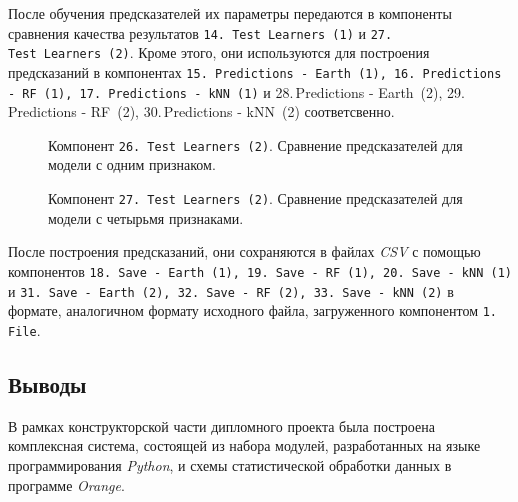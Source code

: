 После обучения предсказателей их параметры передаются в компоненты сравнения качества результатов \texttt{14.\,Test~Learners~(1)} и \texttt{27.\,Test~Learners~(2)}. Кроме этого, они используются для построения предсказаний в компонентах \texttt{15.\,Predictions - Earth~(1), 16.\,Predictions - RF~(1), 17.\,Predictions - kNN~(1)} и {28.\,Predictions - Earth~(2), 29.\,Predictions - RF~(2), 30.\,Predictions - kNN~(2)} соответсвенно.

\begin{figure}[tbp]
    \caption{Компонент \texttt{26.\,Test~Learners~(2)}. Сравнение предсказателей для модели с одним признаком.}
    \label{img:14-Test-Learners-1}
\end{figure}

\begin{figure}[tbp]
    \caption{Компонент \texttt{27.\,Test~Learners~(2)}. Сравнение предсказателей для модели с четырьмя признаками.}
    \label{img:27-Test-Learners-2}
\end{figure}

После построения предсказаний, они сохраняются в файлах \textit{CSV} с помощью компонентов \texttt{18.\,Save - Earth~(1), 19.\,Save - RF~(1), 20.\,Save - kNN~(1)} и \texttt{31.\,Save - Earth~(2), 32.\,Save - RF~(2), 33.\,Save - kNN~(2)} в формате, аналогичном формату исходного файла, загруженного компонентом \texttt{1.\,File}.


\subsection{Выводы}
В рамках конструкторской части дипломного проекта была построена комплексная система, состоящей из набора модулей, разработанных на языке программирования \textit{Python}, и схемы статистической обработки данных в программе \textit{Orange}.